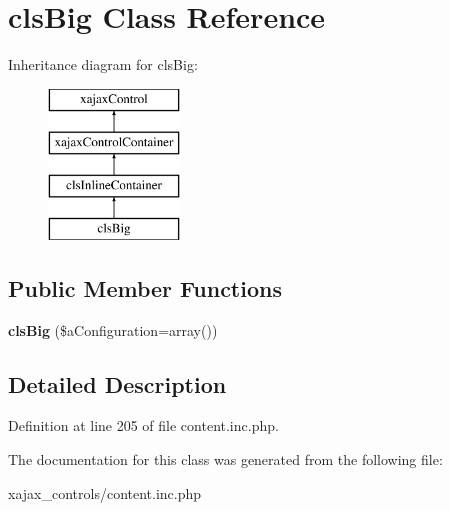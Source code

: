 \hypertarget{classclsBig}{
\section{clsBig Class Reference}
\label{classclsBig}
}
Inheritance diagram for clsBig:\begin{figure}[H]
\begin{center}
\leavevmode
\includegraphics[height=4.000000cm]{classclsBig}
\end{center}
\end{figure}
\subsection*{Public Member Functions}
\begin{DoxyCompactItemize}
\item 
\hypertarget{classclsBig_a7aa347317bf2c17f6374541f75b1dab9}{
{\bfseries clsBig} (\$aConfiguration=array())}
\label{classclsBig_a7aa347317bf2c17f6374541f75b1dab9}

\end{DoxyCompactItemize}


\subsection{Detailed Description}


Definition at line 205 of file content.inc.php.



The documentation for this class was generated from the following file:\begin{DoxyCompactItemize}
\item 
xajax\_\-controls/content.inc.php\end{DoxyCompactItemize}
